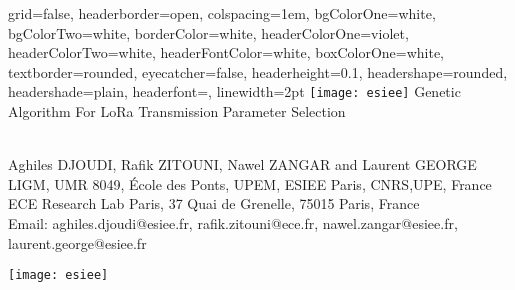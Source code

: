 \begin{poster}{
    grid=false,
    headerborder=open,           %
    colspacing=1em,              %
    bgColorOne=white,            %
    bgColorTwo=white,            %
    borderColor=white,           %
    headerColorOne=violet,       %
    headerColorTwo=white,        %
    headerFontColor=white,       %
    boxColorOne=white,           %
    textborder=rounded,          %
    eyecatcher=false,            %
    headerheight=0.1\textheight, %
    headershape=rounded,         %
    headershade=plain,
    headerfont=\Large\textsf,    %
    linewidth=2pt                %
}{
    \texttt{[image: esiee]}
}{
   \LARGE\textsf{Genetic Algorithm For LoRa Transmission Parameter Selection}
}{
    \sf\vspace{0.2em}\\
    Aghiles DJOUDI, Rafik ZITOUNI, Nawel ZANGAR and Laurent GEORGE
    \vspace{0.3em}\\
    \small{
         LIGM, UMR 8049, École des Ponts, UPEM, ESIEE Paris, CNRS,UPE, France\\
         ECE Research Lab Paris, 37 Quai de Grenelle, 75015 Paris, France
        \vspace{0.3em}\\
    }
    Email:   aghiles.djoudi@esiee.fr, rafik.zitouni@ece.fr, nawel.zangar@esiee.fr, laurent.george@esiee.fr

}{
    \texttt{[image: esiee]}
}



\end{poster}
